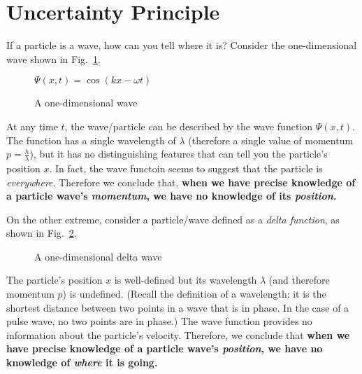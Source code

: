 \section{Uncertainty Principle}
If a particle is a wave, how can you tell where it is? Consider the
one-dimensional wave shown in Fig.~\ref{fig:1d-wave}.
\begin{figure}[ht]
  \centering
  $\Psi(x,t)=\cos(kx-\omega t)$\\
  \caption{A one-dimensional wave}
  \label{fig:1d-wave}
\end{figure}
At any time $t$, the wave/particle can be described by the wave function
$\Psi(x,t)$. The function has a single wavelength of $\lambda$ (therefore a
single value of momentum $p=\frac h\lambda$), but it has no distinguishing
features that can tell you the particle's position $x$. In fact, the wave
functoin seems to suggest that the particle is \emph{everywhere}. Therefore we
conclude that, \textbf{when we have precise knowledge of a particle wave's
  \emph{momentum}, we have no knowledge of its \emph{position}.}

On the other extreme, consider a particle/wave defined as a
\emph{delta function}, as shown in Fig.~\ref{fig:1d-delta-wave}.
\begin{figure}[ht]
  \centering
  \vspace{-.3in}
  \caption{A one-dimensional delta wave}
  \label{fig:1d-delta-wave}
\end{figure}
The particle's position $x$ is well-defined but its wavelength $\lambda$ (and
therefore momentum $p$) is undefined. (Recall the definition of a wavelength:
it is the shortest distance between two points in a wave that is in phase. In
the case of a pulse wave, no two points are in phase.) The wave function
provides no information about the particle's velocity. Therefore, we conclude
that \textbf{when we have precise knowledge of a particle wave's
  \emph{position},  we have no knowledge of \emph{where} it is going.}

